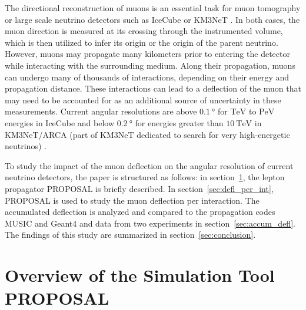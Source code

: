 The directional reconstruction of muons is an essential task for muon tomography or large scale neutrino detectors such as IceCube 
\cite{IceCube_Instrumentation} or KM3NeT \cite{KM3NeT_Design}. In both cases, the muon direction is measured at its crossing through the instrumented volume, which is then utilized to infer its origin or the origin of the parent neutrino. 
However, muons may propagate many kilometers prior to entering the detector while interacting with the surrounding medium. 
Along their propagation, muons can undergo many of thousands 
of interactions, depending on their energy and propagation distance. 
These interactions can lead to a deflection of the muon that may need to be accounted for as an additional source of uncertainty in these measurements. 
Current angular resolutions are above
$\SI{0.1}{\degree}$ for  
$\si{\tera\electronvolt}$ to $\si{\peta\electronvolt}$ energies in IceCube 
\cite{IceCube_Resolution2021} 
and below 
$\SI{0.2}{\degree}$ for energies greater than $\SI{10}{\tera\electronvolt}$ in 
KM3NeT/ARCA (part of KM3NeT dedicated to search for very high-energetic neutrinos) \cite{KM3NeT_Resolution2021}.

To study the impact of the muon deflection on the angular resolution 
of current neutrino detectors, 
the paper is structured as follows: in section~\ref{sec:proposal},
the lepton propagator PROPOSAL is briefly described. In section~\ref{sec:defl_per_int},
PROPOSAL \cite{koehne2013proposal, dunsch_2018_proposal_improvements} is used to study the muon deflection per interaction.
The accumulated deflection is analyzed and compared to the propagation codes
MUSIC \cite{MUSIC} and Geant4 \cite{GEANT4} and data from two experiments in section~\ref{sec:accum_defl}. The findings of this study
are summarized in section~\ref{sec:conclusion}.

\section{Overview of the Simulation Tool PROPOSAL}\label{sec:proposal}

